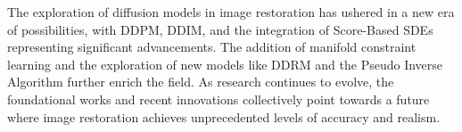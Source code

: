 \begin{survey}
The exploration of diffusion models in image restoration has ushered in a new era of possibilities, with DDPM, DDIM, and the integration of Score-Based SDEs representing significant advancements. The addition of manifold constraint learning and the exploration of new models like DDRM and the Pseudo Inverse Algorithm further enrich the field. As research continues to evolve, the foundational works and recent innovations collectively point towards a future where image restoration achieves unprecedented levels of accuracy and realism.






\end{survey}
